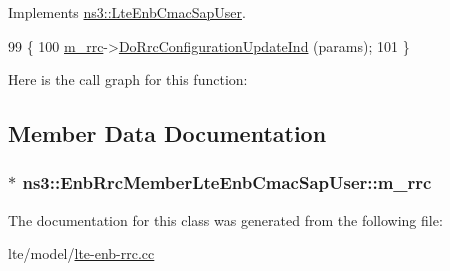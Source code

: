 Implements \hyperlink{classns3_1_1LteEnbCmacSapUser_a8f4da51dc1d210f48d07efc198e7d08a}{ns3\+::\+Lte\+Enb\+Cmac\+Sap\+User}.


\begin{DoxyCode}
99 \{
100   \hyperlink{classns3_1_1EnbRrcMemberLteEnbCmacSapUser_a77f853b016838574d7011999ac29a357}{m\_rrc}->\hyperlink{classns3_1_1LteEnbRrc_a88e583e7d72ccdf0367eacfc8ed94490}{DoRrcConfigurationUpdateInd} (params);
101 \}
\end{DoxyCode}


Here is the call graph for this function\+:




\subsection{Member Data Documentation}
\subsubsection[{\texorpdfstring{m\+\_\+rrc}{m_rrc}}]{$\ast$ ns3\+::\+Enb\+Rrc\+Member\+Lte\+Enb\+Cmac\+Sap\+User\+::m\+\_\+rrc\hspace{0.3cm}{\ttfamily [private]}}\hypertarget{classns3_1_1EnbRrcMemberLteEnbCmacSapUser_a77f853b016838574d7011999ac29a357}{}\label{classns3_1_1EnbRrcMemberLteEnbCmacSapUser_a77f853b016838574d7011999ac29a357}


The documentation for this class was generated from the following file\+:\begin{DoxyCompactItemize}
\item 
lte/model/\hyperlink{lte-enb-rrc_8cc}{lte-\/enb-\/rrc.\+cc}\end{DoxyCompactItemize}

